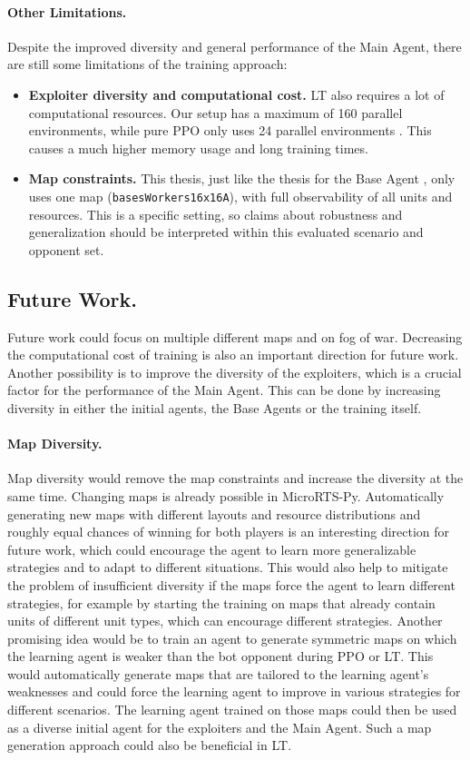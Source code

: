 \documentclass[10pt,twocolumn,letterpaper]{article}
\begin{document}
\paragraph{Other Limitations.}
Despite the improved diversity and general performance of the Main Agent, there are still some limitations of the training approach:
\begin{itemize}
    \item \textbf{Exploiter diversity and computational cost.}
    LT also requires a lot of computational resources.
    Our setup has a maximum of 160 parallel environments, while pure PPO only uses 24 parallel environments \cite{huft2023microrts}.
    This causes a much higher memory usage and long training times.
    \item \textbf{Map constraints.}
    This thesis, just like the thesis for the Base Agent \cite{huft2023microrts}, only uses one map (\texttt{basesWorkers16x16A}), with full observability of all units and resources.
    This is a specific setting, so claims about robustness and generalization should be interpreted within this evaluated scenario and opponent set.
\end{itemize}


\subsection{Future Work.}
Future work could focus on multiple different maps and on fog of war.
Decreasing the computational cost of training is also an important direction for future work.
Another possibility is to improve the diversity of the exploiters, which is a crucial factor for the performance of the Main Agent.
This can be done by increasing diversity in either the initial agents, the Base Agents or the training itself.


\paragraph{Map Diversity.}
Map diversity would remove the map constraints and increase the diversity at the same time.
Changing maps is already possible in MicroRTS-Py.
Automatically generating new maps with different layouts and resource distributions and roughly equal chances of winning for both players is an interesting direction for future work, which could encourage the agent to learn more generalizable strategies and to adapt to different situations.
This would also help to mitigate the problem of insufficient diversity if the maps force the agent to learn different strategies, for example by starting the training on maps that already contain units of different unit types, which can encourage different strategies.
Another promising idea would be to train an agent to generate symmetric maps on which the learning agent is weaker than the bot opponent during PPO or LT.
This would automatically generate maps that are tailored to the learning agent's weaknesses and could force the learning agent to improve in various strategies for different scenarios.
The learning agent trained on those maps could then be used as a diverse initial agent for the exploiters and the Main Agent.
Such a map generation approach could also be beneficial in LT.
\end{document}
